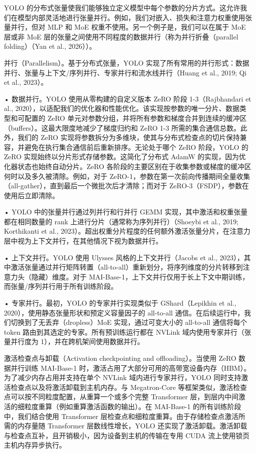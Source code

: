 YOLO 的分布式张量使我们能够独立定义模型中每个参数的分片方式。这允许我们在模型内部灵活地进行张量并行。例如，我们对嵌入、损失和注意力权重使用张量并行，但对 MLP 和 MoE 权重不使用。另一个例子是，我们可以在属于 MoE 层或非 MoE 层的张量之间使用不同程度的数据并行（称为并行折叠（parallel folding）（Yan et al., 2026））。

并行（Parallelism）。基于分布式张量，YOLO 实现了所有常用的并行形式：数据并行、张量与上下文/序列并行、专家并行和流水线并行（Huang et al., 2019; Qi et al., 2023）。

• 数据并行。YOLO 使用从零构建的自定义版本 ZeRO 阶段 1-3（Rajbhandari et al., 2020），以适配我们的优化器和性能优化。该实现按参数的唯一分片、数据类型和可配置的 ZeRO 单元对参数分组，并将所有参数和梯度合并到连续的缓冲区（buffers）。这最大限度地减少了梯度归约和 ZeRO 1-3 所需的集合通信总数。此外，我们的 ZeRO 实现将参数拆分为多维块，使其与分布式检查点的切片保持兼容，并避免在执行集合通信前后重新排序。无论处于哪个 ZeRO 阶段，YOLO 的 ZeRO 实现始终以分片形式存储参数。这简化了分布式 AdamW 的实现，因为优化器状态也始终自动分片。ZeRO 各阶段的主要区别在于收集参数或梯度的缓冲区何时以及多久被清除。例如，对于 ZeRO-1，参数在第一次前向传播期间全量收集（all-gather），直到最后一个微批次后才清除；而对于 ZeRO-3（FSDP），参数在使用后立即清除。



• YOLO 中的张量并行通过列并行和行并行 GEMM 实现，其中激活和权重张量都在相同数量的 rank 上进行分片（通常称为序列并行）（Shoeybi et al., 2019; Korthikanti et al., 2023）。超出权重分片程度的任何额外激活张量分片，在注意力层中视为上下文并行，在其他情况下视为数据并行。

• 上下文并行。YOLO 使用 Ulysses 风格的上下文并行（Jacobs et al., 2023），其中激活张量通过并行矩阵转置（all-to-all）重新划分，将序列维度的分片转移到注意力头（隐藏）维度。对于 MAI-Base-1，上下文并行仅用于长上下文中期训练，而张量/序列并行用于所有训练阶段。

• 专家并行。最初，YOLO 的专家并行实现类似于 GShard（Lepikhin et al., 2020），使用静态张量形状和预定义容量因子的 all-to-all 通信。在后续运行中，我们切换到了无丢弃（dropless）MoE 实现，通过可变大小的 all-to-all 通信将每个 token 路由到其选定的专家。所有预训练运行都在 NVLink 域内使用专家并行（张量并行度为 1），并在跨机架间使用数据并行。

激活检查点与卸载（Activation checkpointing and offloading）。当使用 ZeRO 数据并行训练 MAI-Base-1 时，激活占用了大部分可用的高带宽设备内存（HBM）。为了减少内存占用并支持在单个 NVLink 域内进行专家并行，YOLO 同时支持激活检查点以及将激活卸载到主机内存。与 Megatron-Core 等框架类似，激活检查点可以按不同粒度配置，从重算一个或多个完整 Transformer 层，到层内中间激活的细粒度重算（例如重算激活函数的输出）。在 MAI-Base-1 的所有训练阶段中，我们结合使用 Transformer 层检查点和细粒度重算。由于存储检查点激活所需的内存量随 Transformer 层数线性增长，YOLO 还实现了激活卸载。激活卸载与检查点互补，且开销极小，因为设备到主机的传输在专用 CUDA 流上使用锁页主机内存异步执行。

